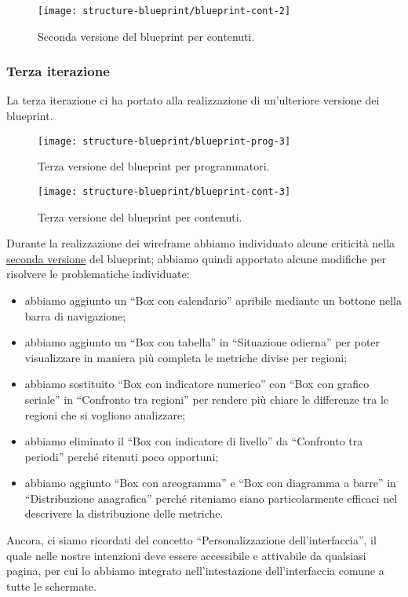 \begin{figure}[H]
    \centering
    \texttt{[image: structure-blueprint/blueprint-cont-2]}
    \caption{Seconda versione del blueprint per contenuti.}\label{fig:blueprint-cont-2}
\end{figure}
\clearpage
\subsubsection{Terza iterazione}
La terza iterazione ci ha portato alla realizzazione di un'ulteriore versione  dei blueprint.
\begin{figure}[H]
    \centering
    \texttt{[image: structure-blueprint/blueprint-prog-3]}
    \caption{Terza versione del blueprint per programmatori.}\label{fig:blueprint-prog-3}
\end{figure}
\begin{figure}[H]
    \centering
    \texttt{[image: structure-blueprint/blueprint-cont-3]}
    \caption{Terza versione del blueprint per contenuti.}\label{fig:blueprint-cont-3}
\end{figure}
\noindent
Durante la realizzazione dei wireframe abbiamo individuato alcune criticità nella \hyperref[ss:seconda-iterazione]{seconda versione} del blueprint; abbiamo quindi apportato alcune modifiche per risolvere le problematiche individuate:
\begin{itemize}
    \item abbiamo aggiunto un ``Box con calendario'' apribile mediante un bottone nella barra di navigazione;
    \item abbiamo aggiunto un ``Box con tabella'' in ``Situazione odierna'' per poter visualizzare in maniera più completa le metriche divise per regioni;
    \item abbiamo sostituito ``Box con indicatore numerico'' con  ``Box con grafico seriale'' in ``Confronto tra regioni'' per rendere più chiare le differenze tra le regioni che si vogliono analizzare;
    \item abbiamo eliminato il ``Box con indicatore di livello'' da ``Confronto tra periodi'' perché ritenuti poco opportuni;
    \item abbiamo aggiunto ``Box con areogramma'' e ``Box con diagramma a barre'' in ``Distribuzione anagrafica'' perché riteniamo siano particolarmente efficaci nel descrivere la distribuzione delle metriche.
\end{itemize}
Ancora, ci siamo ricordati del concetto ``Personalizzazione dell'interfaccia'', il quale nelle nostre intenzioni deve essere accessibile e attivabile da qualsiasi pagina, per cui lo abbiamo integrato nell'intestazione dell'interfaccia comune a tutte le schermate.
